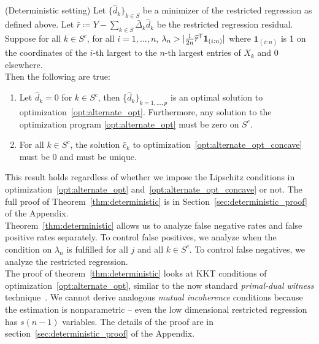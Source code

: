 \begin{theorem} (Deterministic setting)
\label{thm:deterministic}
Let $\{\hat{d}_k \}_{k \in S}$ be a minimizer of the restricted regression as defined above.
Let $\hat{r} \coloneqq Y - \sum_{k \in S} \bar{\Delta}_k \hat{d}_k$ be the restricted regression residual. \\

Suppose for all $k\in S^c$, for all $i=1,...,n$, $\lambda_n > | \frac{1}{2n}
\widehat{r}^{\mathsf{T}} \mbox{\boldmath $1$}_{(i:n)}|$ where $\mathbf{1}_{(i:n)}$ is 1 on the coordinates of the $i$-th largest to the $n$-th largest entries of $X_k$ and 0 elsewhere.\\

Then the following are true:
\begin{enumerate}
\item Let $\hat{d}_k = 0$ for $k \in S^c$, then \{$\hat{d}_k\}_{k=1,...,p}$ is an optimal solution to optimization~\ref{opt:alternate_opt}. Furthermore, any solution to the optimization program \ref{opt:alternate_opt} must be zero on $S^c$.
\item For all $k \in S^c$, the solution $\hat{c}_k$ to optimization~\ref{opt:alternate_opt_concave} must be 0 and must be unique.
\end{enumerate}

\end{theorem}

This result holds regardless of whether we impose the Lipschitz conditions in optimization~\ref{opt:alternate_opt} and~\ref{opt:alternate_opt_concave} or not.
The full proof of Theorem~\ref{thm:deterministic} is in Section~\ref{sec:deterministic_proof} of the Appendix.\\

Theorem~\ref{thm:deterministic} allows us to analyze false negative
rates and false positive rates separately. To control false positives,
we analyze when the condition on $\lambda_n$ is fulfilled for all $j$ and all $k \in S^c$. To control false negatives, we analyze the restricted regression. \\

The proof of theorem~\ref{thm:deterministic} looks at KKT conditions of optimization~\ref{opt:alternate_opt}, similar to the now standard \emph{primal-dual witness} technique~\cite{wainwright2009sharp}. We cannot derive analogous \emph{mutual incoherence} conditions because the estimation is nonparametric -- even the low dimensional restricted regression has $s(n-1)$ variables. The details of the proof are in section~\ref{sec:deterministic_proof} of the Appendix.

